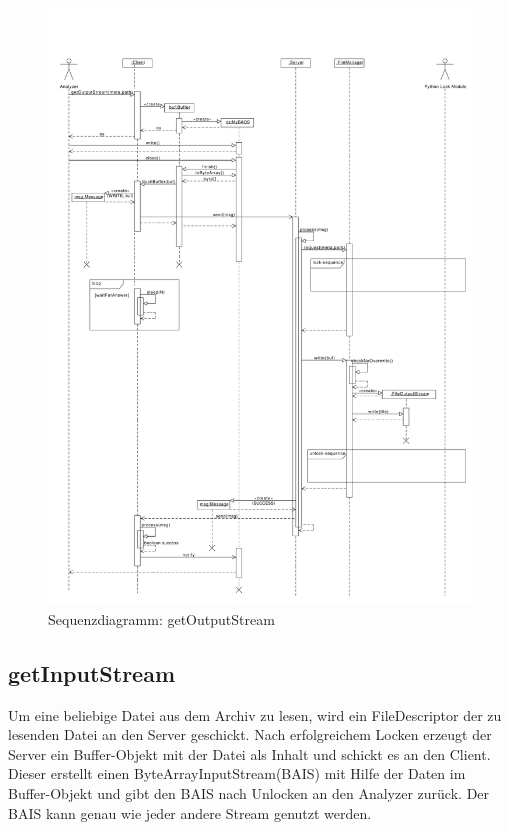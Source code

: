 \begin{figure}[h]
	\centering
	\label{dia:design:frontend:sqc:getOutputStream}
	\includegraphics[width=\textwidth]{design/frontend/sequence/get-output-stream-sequence.pdf}
	\caption{Sequenzdiagramm: getOutputStream}
\end{figure}

\subsection {getInputStream}

Um eine beliebige Datei aus dem Archiv zu lesen, wird ein FileDescriptor der zu lesenden Datei an den Server geschickt.
Nach erfolgreichem Locken erzeugt der Server ein Buffer-Objekt mit der Datei als Inhalt und schickt es an den Client.
Dieser erstellt einen ByteArrayInputStream(BAIS) mit Hilfe der Daten im Buffer-Objekt und gibt den BAIS nach Unlocken  an den Analyzer zurück.
Der BAIS kann genau wie jeder andere Stream genutzt werden.

